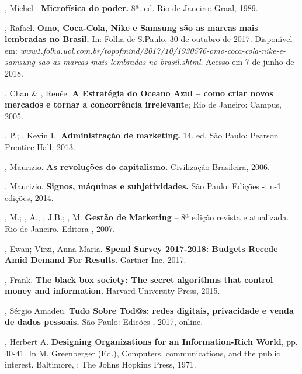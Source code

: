 , Michel . \textbf{Microfísica do poder.} 8ª. ed. Rio de
Janeiro: Graal, 1989.

, Rafael. \textbf{Omo, Coca-Cola, Nike e Samsung são as marcas
mais lembradas no Brasil.} In: Folha de S.Paulo, 30 de outubro de 2017.
Disponível em:
\emph{www1.folha.uol.com.br/topofmind/2017/10/1930576-omo-coca-cola-nike-e-samsung-sao-as-marcas-mais-lembradas-no-brasil.shtml}.
Acesso em 7 de junho de 2018.

, Chan \& , Renée. \textbf{A Estratégia do Oceano Azul --
como criar novos mercados e tornar a concorrência irrelevant}e; Rio de
Janeiro: Campus, 2005.

, P.; , Kevin L. \textbf{Administração de marketing.} 14.
ed. São Paulo: Pearson Prentice Hall, 2013.

, Maurizio. \textbf{As revoluções do capitalismo.} Civilização
Brasileira, 2006.

, Maurizio. \textbf{Signos, máquinas e subjetividades.} São
Paulo: Edições -: n-1 edições, 2014.

, M.; , A.; , J.B.; , M. \textbf{Gestão de
Marketing} -- 8ª edição revista e atualizada. Rio de Janeiro. Editora
, 2007.

, Ewan; Virzi, Anna Maria. \textbf{ Spend Survey 2017-2018:
Budgets Recede Amid Demand For Results}. Gartner Inc. 2017.

, Frank. \textbf{The black box society: The secret algorithms
that control money and information.} Harvard University Press, 2015.

, Sérgio Amadeu. \textbf{Tudo Sobre Tod@s: redes digitais,
privacidade e venda de dados pessoais.} São Paulo: Edicões , 2017,
online.

, Herbert A. \textbf{Designing Organizations for an
Information-Rich World}, pp. 40-41. In M. Greenberger (Ed.), Computers,
communications, and the public interest. Baltimore, : The Johns
Hopkins Press, 1971.
